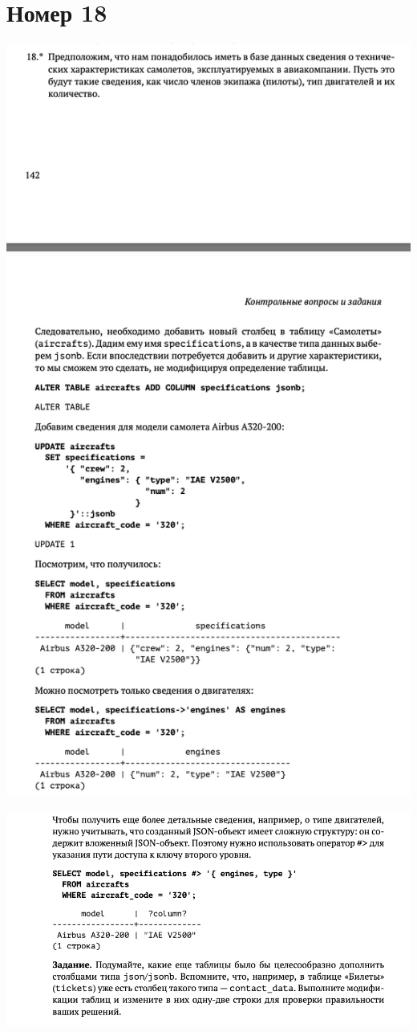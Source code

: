 \documentclass[a4paper,12pt]{article}
\begin{document}
\section*{Номер 18}
\begin{center}
\includegraphics[scale=0.7]{18.png}
\end{center}
\begin{center}
\includegraphics[scale=0.7]{181.png}
\end{center}
\end{document}
